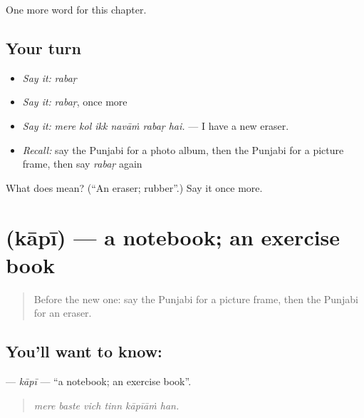 \begin{grammarlens}[title={What you've built}]
One more word for this chapter.
\end{grammarlens}

\subsection*{Your turn}
\begin{itemize}
\raggedright
  \item \emph{Say it:} \emph{rabaṛ}
  \item \emph{Say it:} \emph{rabaṛ}, once more
  \item \emph{Say it:} \emph{mere kol ikk navāṁ rabaṛ hai.} — I have a new eraser.
  \item \emph{Recall:} say the Punjabi for a photo album, then the Punjabi for a picture frame, then say \emph{rabaṛ} again
\end{itemize}

\begin{tcolorbox}[breakable,colback=teal!4,colframe=teal!35!black,title={Before you move on}]
What does  mean? (\textquotedblleft{}An eraser; rubber\textquotedblright{}.) Say it once more.
\end{tcolorbox}
\section[\texorpdfstring{\pa{ਕਾਪੀ} (kāpī)}{ਕਾਪੀ (kāpī)}]{ (kāpī) — a notebook; an exercise book}

\label{lesson:PA-C357-kapi}



\begin{quote}
Before the new one: say the Punjabi for a picture frame, then the Punjabi for an eraser.
\end{quote}

\subsection*{You'll want to know: }
\textbf{} — \emph{kāpī} — \textquotedblleft{}a notebook; an exercise book\textquotedblright{}.

\begin{quote}
     
\end{quote}

\begin{quote}
\emph{mere baste vich tinn kāpīāṁ han.}
\end{quote}

